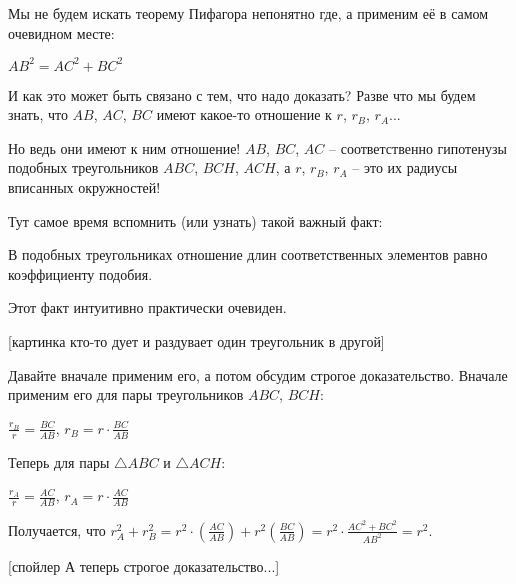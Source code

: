Мы не будем искать теорему Пифагора непонятно где, а применим её в самом очевидном месте:

$AB^2 = AC^2 + BC^2$

И как это может быть связано с тем, что надо доказать? Разве что мы будем знать, что $AB$, $AC$, $BC$ имеют какое-то отношение к $r$, $r_B$, $r_A$...

Но ведь они имеют к ним отношение! 
$AB$, $BC$, $AC$ -- соответственно гипотенузы подобных треугольников $ABC$, $BCH$, $ACH$, а $r$, $r_B$, $r_A$ -- это их радиусы вписанных окружностей!

Тут самое время вспомнить (или узнать) такой важный факт:

В подобных треугольниках отношение длин соответственных элементов равно коэффициенту подобия.

Этот факт интуитивно практически очевиден.

[картинка кто-то дует и раздувает один треугольник в другой]

Давайте вначале применим его, а потом обсудим строгое доказательство.
Вначале применим его для пары треугольников $ABC$, $BCH$:

$\frac{r_B}{r} = \frac{BC}{AB}$, $r_B = r \cdot \frac{BC}{AB}$

Теперь для пары $\triangle ABC$ и $\triangle ACH$:

$\frac{r_A}{r} = \frac{AC}{AB}$, $r_A = r \cdot \frac{AC}{AB}$

Получается, что 
$r_A^2 + r_B^2 = r^2 \cdot  \left(\frac{AC}{AB}\right) + r^2 \left(\frac{BC}{AB}\right) = r^2 \cdot \frac{AC^2 + BC^2}{AB^2} = r^2$.

[спойлер А теперь строгое доказательство...] 

